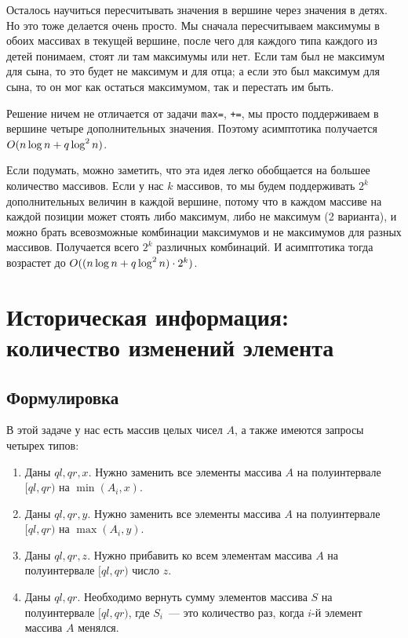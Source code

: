 Осталось научиться пересчитывать значения в вершине через значения в детях. Но это тоже делается очень просто. Мы сначала пересчитываем максимумы в обоих массивах в текущей вершине, после чего для каждого типа каждого из детей понимаем, стоят ли там максимумы или нет. Если там был не максимум для сына, то это будет не максимум и для отца; а если это был максимум для сына, то он мог как остаться максимумом, так и перестать им быть.

Решение ничем не отличается от задачи \verb+max=+, \verb^+=^, мы просто поддерживаем в вершине четыре дополнительных значения. Поэтому асимптотика получается $O(n \log n + q \log^2 n)$.

\begin{observation}
    Если подумать, можно заметить, что эта идея легко обобщается на большее количество массивов. Если у нас $k$ массивов, то мы будем поддерживать $2^k$ дополнительных величин в каждой вершине, потому что в каждом массиве на каждой позиции может стоять либо максимум, либо не максимум (2 варианта), и можно брать всевозможные комбинации максимумов и не максимумов для разных массивов. Получается всего $2^k$ различных комбинаций. И асимптотика тогда возрастет до $O((n \log n + q \log^2 n) \cdot 2^k)$.
\end{observation}






\cprotect \section{Историческая информация: количество изменений элемента}

\subsection{Формулировка}

В этой задаче у нас есть массив целых чисел $A$, а также имеются запросы четырех типов:

\begin{enumerate}
    \item Даны $ql, qr, x$. Нужно заменить все элементы массива $A$ на полуинтервале $[ql, qr)$ на $\min(A_i, x)$.
    \item Даны $ql, qr, y$. Нужно заменить все элементы массива $A$ на полуинтервале $[ql, qr)$ на $\max(A_i, y)$.
    \item Даны $ql, qr, z$. Нужно прибавить ко всем элементам массива $A$ на полуинтервале $[ql, qr)$ число $z$.
    \item Даны $ql, qr$. Необходимо вернуть сумму элементов массива $S$ на полуинтервале $[ql, qr)$, где $S_i$~--- это количество раз, когда $i$-й элемент массива $A$ менялся.
\end{enumerate}

